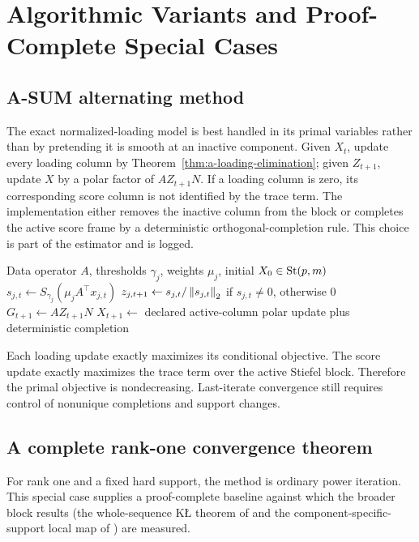 \section{Algorithmic Variants and Proof-Complete Special Cases}
\label{sec:a-complete-special-cases}

\subsection{A-SUM alternating method}
The exact normalized-loading model is best handled in its primal variables rather than by pretending it is smooth at an inactive component. Given $X_t$, update every loading column by Theorem~\ref{thm:a-loading-elimination}; given $Z_{t+1}$, update $X$ by a polar factor of $AZ_{t+1}N$. If a loading column is zero, its corresponding score column is not identified by the trace term. The implementation either removes the inactive column from the block or completes the active score frame by a deterministic orthogonal-completion rule. This choice is part of the estimator and is logged.

\begin{algorithm}[t]
\caption{A-SUM alternating support-and-score update}
\label{alg:a-sum-alternating}
\begin{algorithmic}[1]
\Require Data operator $A$, thresholds $\gamma_j$, weights $\mu_j$, initial $X_0\in\mathrm{St}(p,m)$
    \State $s_{j,t}\gets S_{\gamma_j}(\mu_jA^\top x_{j,t})$
    \State $z_{j,t+1}\gets s_{j,t}/\left\lVert s_{j,t} \right\rVert_2$ if $s_{j,t}\neq0$, otherwise $0$
  \EndFor
  \State $G_{t+1}\gets AZ_{t+1}N$
  \State $X_{t+1}\gets$ declared active-column polar update plus deterministic completion
\EndFor
\end{algorithmic}
\end{algorithm}

Each loading update exactly maximizes its conditional objective. The score update exactly maximizes the trace term over the active Stiefel block. Therefore the primal objective is nondecreasing. Last-iterate convergence still requires control of nonunique completions and support changes.

\subsection{A complete rank-one convergence theorem}
For rank one and a fixed hard support, the method is ordinary power iteration. This special case supplies a proof-complete baseline against which the broader block results (the whole-sequence KŁ theorem of  and the component-specific-support local map of ) are measured.

